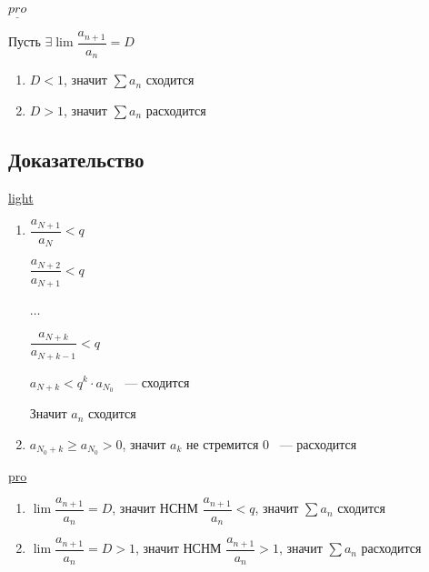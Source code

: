 \documentclass{article}
\begin{document}
            $\underline{pro}$
            
            Пусть $\exists \lim \dfrac{a_{n + 1}}{a_n} = D$
            
            \begin{enumerate}
            
                \item $D < 1$, значит $\sum a_n$ сходится
                
                \item $D > 1$, значит $\sum a_n$ расходится
                
            \end{enumerate}
    
        \subsection{Доказательство}
        
            \underline{light}
            
            \begin{enumerate}
            
                \item 
                
                    $\dfrac{a_{N + 1}}{a_N} < q$
                    
                    $\dfrac{a_{N + 2}}{a_{N + 1}} < q$
                    
                    $\ldots$
                    
                    $\dfrac{a_{N + k}}{a_{N + k - 1}} < q$
                    
                    $a_{N + k} < q^k \cdot a_{N_0}$ ~--- сходится
                    
                    Значит $a_n$ сходится
                    
                \item
                
                    $a_{N_0 + k} \geq a_{N_0} > 0$, значит $a_k$ не стремится $0$ ~--- расходится
                
            \end{enumerate}
            
            \underline{pro}
            
            \begin{enumerate}
            
                \item $\lim \dfrac{a_{n + 1}}{a_n} = D$, значит НСНМ $\dfrac{a_{n + 1}}{a_n} < q$, значит $\sum a_n$ сходится
                
                \item $\lim \dfrac{a_{n + 1}}{a_n} = D > 1$, значит НСНМ $\dfrac{a_{n + 1}}{a_n} > 1$, значит $\sum a_n$ расходится
                
            \end{enumerate}
            
\end{document}
